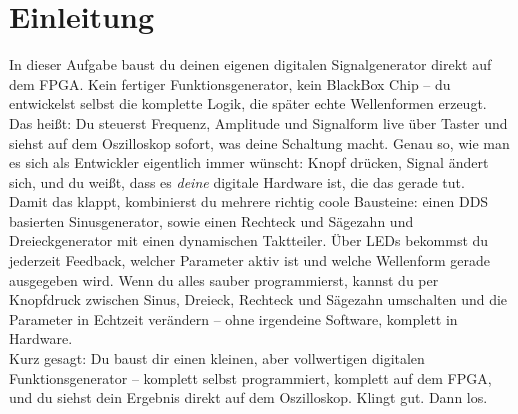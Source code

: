 \chapter{Einleitung}



In dieser Aufgabe baust du deinen eigenen digitalen Signalgenerator direkt auf 
dem FPGA. Kein fertiger Funktionsgenerator, kein BlackBox Chip – du entwickelst 
selbst die komplette Logik, die später echte Wellenformen erzeugt. Das heißt: 
Du steuerst Frequenz, Amplitude und Signalform live über Taster und siehst auf 
dem Oszilloskop sofort, was deine Schaltung macht. Genau so, wie man es sich 
als Entwickler eigentlich immer wünscht: Knopf drücken, Signal ändert sich, 
und du weißt, dass es \emph{deine} digitale Hardware ist, die das gerade tut.\\

Damit das klappt, kombinierst du mehrere richtig coole Bausteine: einen 
DDS basierten Sinusgenerator, sowie einen Rechteck und Sägezahn und Dreieckgenerator mit einen dynamischen Taktteiler. 
Über LEDs bekommst du jederzeit 
Feedback, welcher Parameter aktiv ist und welche Wellenform gerade ausgegeben 
wird. Wenn du alles sauber programmierst, kannst du per Knopfdruck zwischen 
Sinus, Dreieck, Rechteck und Sägezahn umschalten und die Parameter in Echtzeit 
verändern – ohne irgendeine Software, komplett in Hardware.\\

Kurz gesagt: Du baust dir einen kleinen, aber vollwertigen digitalen 
Funktionsgenerator – komplett selbst programmiert, komplett auf dem FPGA, 
und du siehst dein Ergebnis direkt auf dem Oszilloskop. Klingt gut. Dann los.